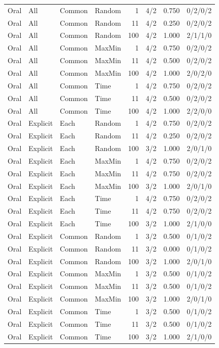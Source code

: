 \begin{longtable}{llllrrcc}
Oral & All & Common & Random & 1 & 4/2 & 0.750 & 0/2/0/2 \\
Oral & All & Common & Random & 11 & 4/2 & 0.250 & 0/2/0/2 \\
Oral & All & Common & Random & 100 & 4/2 & 1.000 & 2/1/1/0 \\
Oral & All & Common & MaxMin & 1 & 4/2 & 0.750 & 0/2/0/2 \\
Oral & All & Common & MaxMin & 11 & 4/2 & 0.500 & 0/2/0/2 \\
Oral & All & Common & MaxMin & 100 & 4/2 & 1.000 & 2/0/2/0 \\
Oral & All & Common & Time & 1 & 4/2 & 0.750 & 0/2/0/2 \\
Oral & All & Common & Time & 11 & 4/2 & 0.500 & 0/2/0/2 \\
Oral & All & Common & Time & 100 & 4/2 & 1.000 & 2/2/0/0 \\
Oral & Explicit & Each & Random & 1 & 4/2 & 0.750 & 0/2/0/2 \\
Oral & Explicit & Each & Random & 11 & 4/2 & 0.250 & 0/2/0/2 \\
Oral & Explicit & Each & Random & 100 & 3/2 & 1.000 & 2/0/1/0 \\
Oral & Explicit & Each & MaxMin & 1 & 4/2 & 0.750 & 0/2/0/2 \\
Oral & Explicit & Each & MaxMin & 11 & 4/2 & 0.750 & 0/2/0/2 \\
Oral & Explicit & Each & MaxMin & 100 & 3/2 & 1.000 & 2/0/1/0 \\
Oral & Explicit & Each & Time & 1 & 4/2 & 0.750 & 0/2/0/2 \\
Oral & Explicit & Each & Time & 11 & 4/2 & 0.750 & 0/2/0/2 \\
Oral & Explicit & Each & Time & 100 & 3/2 & 1.000 & 2/1/0/0 \\
Oral & Explicit & Common & Random & 1 & 3/2 & 0.500 & 0/1/0/2 \\
Oral & Explicit & Common & Random & 11 & 3/2 & 0.000 & 0/1/0/2 \\
Oral & Explicit & Common & Random & 100 & 3/2 & 1.000 & 2/0/1/0 \\
Oral & Explicit & Common & MaxMin & 1 & 3/2 & 0.500 & 0/1/0/2 \\
Oral & Explicit & Common & MaxMin & 11 & 3/2 & 0.500 & 0/1/0/2 \\
Oral & Explicit & Common & MaxMin & 100 & 3/2 & 1.000 & 2/0/1/0 \\
Oral & Explicit & Common & Time & 1 & 3/2 & 0.500 & 0/1/0/2 \\
Oral & Explicit & Common & Time & 11 & 3/2 & 0.500 & 0/1/0/2 \\
Oral & Explicit & Common & Time & 100 & 3/2 & 1.000 & 2/1/0/0 \\

\end{longtable}\endgroup

